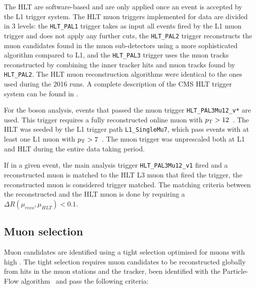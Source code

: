 The HLT are software-based and are only applied once an event is accepted by the L1 trigger system. The HLT muon triggers implemented for \pPb data are divided in 3 levels: the \verb#HLT_PAL1# trigger takes as input all events fired by the L1 muon trigger and does not apply any further cuts, the \verb#HLT_PAL2# trigger reconstructs the muon candidates found in the muon sub-detectors using a more sophisticated algorithm compared to L1, and the \verb#HLT_PAL3# trigger uses the muon tracks reconstructed by combining the inner tracker hits and muon tracks found by \verb#HLT_PAL2#. The HLT muon reconstruction algorithms were identical to the ones used during the 2016 \pp runs. A complete description of the CMS HLT trigger system can be found in \cite{CMS_Trigger}.

For the \W boson analysis, events that passed the muon trigger \verb#HLT_PAL3Mu12_v*# are used. This trigger requires a fully reconstructed online muon with $p_{\mathrm{T}} > 12$~\GeVc. The HLT was seeded by the L1 trigger path \verb#L1_SingleMu7#, which pass events with at least one L1 muon with $p_{\mathrm{T}} > 7$~\GeVc. The muon trigger was unprescaled both at L1 and HLT during the entire data taking period.

If in a given event, the main analysis trigger \verb#HLT_PAL3Mu12_v1# fired and a reconstructed muon is matched to the HLT L3 muon that fired the trigger, the reconstructed muon is considered trigger matched. The matching criteria between the reconstructed and the HLT muon is done by requiring a $\Delta{R}(\mu_{reco} , \mu_{HLT}) < 0.1$.


\subsection{Muon selection} \label{sec:WBoson_Selection_MuonIdentification}

Muon candidates are identified using a tight selection optimised for muons with high \pt. The tight selection requires muon candidates to be reconstructed globally from hits in the muon stations and the tracker,  been identified with the Particle-Flow algorithm~\cite{PF_Reco} and pass the following criteria:

